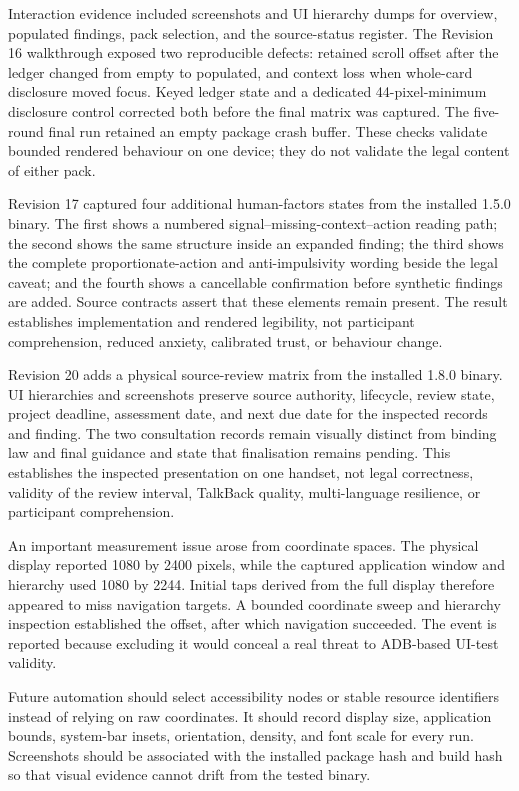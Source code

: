 Interaction evidence included screenshots and UI hierarchy dumps for overview, populated findings, pack selection, and the source-status register. The Revision 16 walkthrough exposed two reproducible defects: retained scroll offset after the ledger changed from empty to populated, and context loss when whole-card disclosure moved focus. Keyed ledger state and a dedicated 44-pixel-minimum disclosure control corrected both before the final matrix was captured. The five-round final run retained an empty package crash buffer. These checks validate bounded rendered behaviour on one device; they do not validate the legal content of either pack.

Revision 17 captured four additional human-factors states from the installed 1.5.0 binary. The first shows a numbered signal--missing-context--action reading path; the second shows the same structure inside an expanded finding; the third shows the complete proportionate-action and anti-impulsivity wording beside the legal caveat; and the fourth shows a cancellable confirmation before synthetic findings are added. Source contracts assert that these elements remain present. The result establishes implementation and rendered legibility, not participant comprehension, reduced anxiety, calibrated trust, or behaviour change.

Revision 20 adds a physical source-review matrix from the installed 1.8.0 binary. UI hierarchies and screenshots preserve source authority, lifecycle, review state, project deadline, assessment date, and next due date for the inspected records and finding. The two consultation records remain visually distinct from binding law and final guidance and state that finalisation remains pending. This establishes the inspected presentation on one handset, not legal correctness, validity of the review interval, TalkBack quality, multi-language resilience, or participant comprehension.

An important measurement issue arose from coordinate spaces. The physical display reported 1080 by 2400 pixels, while the captured application window and hierarchy used 1080 by 2244. Initial taps derived from the full display therefore appeared to miss navigation targets. A bounded coordinate sweep and hierarchy inspection established the offset, after which navigation succeeded. The event is reported because excluding it would conceal a real threat to ADB-based UI-test validity.

Future automation should select accessibility nodes or stable resource identifiers instead of relying on raw coordinates. It should record display size, application bounds, system-bar insets, orientation, density, and font scale for every run. Screenshots should be associated with the installed package hash and build hash so that visual evidence cannot drift from the tested binary.


